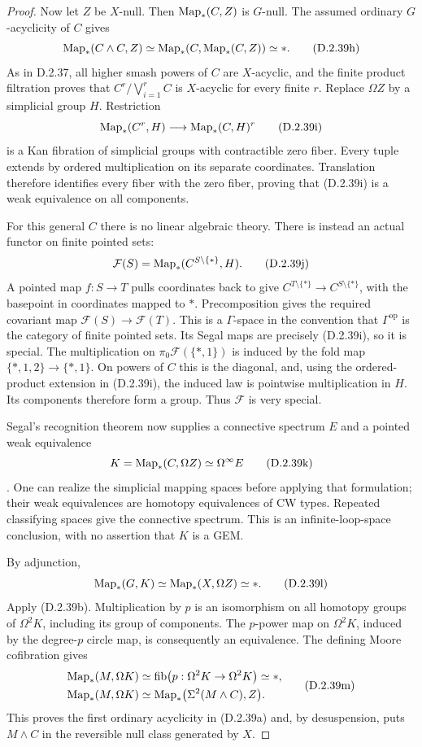 \begin{proof}
Now let $Z$ be $X$-null. Then $\operatorname{Map}_*(C,Z)$ is $G$-null.
The assumed ordinary $G$-acyclicity of $C$ gives
\[
 \operatorname{Map}_*(C\wedge C,Z)
       \simeq\operatorname{Map}_*(C,\operatorname{Map}_*(C,Z))\simeq *.
 \tag{D.2.39h}
\]
As in D.2.37, all higher smash powers of $C$ are $X$-acyclic,
and the finite product filtration proves that
$C^r/\bigvee_{i=1}^rC$ is $X$-acyclic for every finite $r$.
Replace $\Omega Z$ by a simplicial group $H$. Restriction
\[
       \operatorname{Map}_*(C^r,H)\longrightarrow\operatorname{Map}_*(C,H)^r
 \tag{D.2.39i}
\]
is a Kan fibration of simplicial groups with contractible
zero fiber. Every tuple extends by ordered multiplication
on its separate coordinates. Translation therefore identifies
every fiber with the zero fiber, proving that
\textup{(D.2.39i)} is a weak equivalence on all components.

For this general $C$ there is no linear algebraic theory.
There is instead an actual functor on finite pointed sets:
\[
 \mathcal F(S)=\operatorname{Map}_*(C^{S\setminus\{*\}},H).
 \tag{D.2.39j}
\]
A pointed map $f:S\to T$ pulls coordinates back to give
$C^{T\setminus\{*\}}\to C^{S\setminus\{*\}}$, with the
basepoint in coordinates mapped to $*$. Precomposition gives
the required covariant map $\mathcal F(S)\to\mathcal F(T)$.
This is a $\Gamma$-space in the convention that
$\Gamma^{\mathrm{op}}$ is the category of finite pointed
sets. Its Segal maps are precisely
\textup{(D.2.39i)}, so it is special. The multiplication on
$\pi_0\mathcal F(\{*,1\})$ is induced by the fold map
$\{*,1,2\}\to\{*,1\}$. On powers of $C$ this is the
diagonal, and, using the ordered-product extension in
\textup{(D.2.39i)}, the induced law is pointwise
multiplication in $H$. Its components therefore form a
group. Thus $\mathcal F$ is very special.

Segal's recognition theorem now supplies a connective
spectrum $E$ and a pointed weak equivalence
\[
             K=\operatorname{Map}_*(C,\Omega Z)\simeq\Omega^\infty E
 \tag{D.2.39k}
\]
\cite[Definitions~1.1--1.3 and Proposition~1.4,
pp.~295--296; proof in Propositions~1.5--1.6 and
Lemmas~1.7--1.8, pp.~296--298]{I_Segal1974}.
One can realize the simplicial mapping spaces before applying
that formulation; their weak equivalences are homotopy
equivalences of CW types. Repeated classifying spaces give
the connective spectrum. This is an infinite-loop-space
conclusion, with no assertion that $K$ is a GEM.

By adjunction,
\[
             \operatorname{Map}_*(G,K)
                 \simeq\operatorname{Map}_*(X,\Omega Z)\simeq *.
 \tag{D.2.39l}
\]
Apply \textup{(D.2.39b)}. Multiplication by $p$ is an
isomorphism on all homotopy groups of $\Omega^2K$, including
its group of components. The $p$-power map on $\Omega^2K$,
induced by the degree-$p$ circle map, is consequently an
equivalence. The defining
Moore cofibration gives
\[
 \begin{aligned}
 \operatorname{Map}_*(M,\Omega K)
    &\simeq\operatorname{fib}\bigl(p:\Omega^2K\to\Omega^2K\bigr)
       \simeq *,\\
 \operatorname{Map}_*(M,\Omega K)
    &\simeq\operatorname{Map}_*\bigl(\Sigma^2(M\wedge C),Z\bigr).
 \end{aligned}
 \tag{D.2.39m}
\]
This proves the first ordinary acyclicity in
\textup{(D.2.39a)} and, by desuspension, puts $M\wedge C$
in the reversible null class generated by $X$.


\end{proof}
